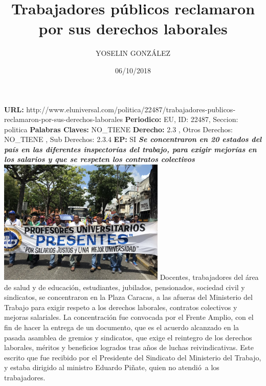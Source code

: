 \documentclass{article}%
\title{\textbf{Trabajadores públicos reclamaron por sus derechos laborales}}%
\author{YOSELIN GONZÁLEZ}%
\date{06/10/2018}%
\begin{document}
%
\normalsize%
\maketitle%
\textbf{URL: }%
http://www.eluniversal.com/politica/22487/trabajadores{-}publicos{-}reclamaron{-}por{-}sus{-}derechos{-}laborales\newline%
%
\textbf{Periodico: }%
EU, %
ID: %
22487, %
Seccion: %
politica\newline%
%
\textbf{Palabras Claves: }%
NO\_TIENE\newline%
%
\textbf{Derecho: }%
2.3%
, Otros Derechos: %
NO\_TIENE%
, Sub Derechos: %
2.3.4%
\newline%
%
\textbf{EP: }%
SI\newline%
\newline%
%
\textbf{\textit{Se concentraron en 20 estados del país en las diferentes inspectorías del trabajo, para exigir mejorías en los salarios y que se respeten los contratos colectivos}}%
\newline%
\newline%
%
\includegraphics[width=300px]{43.jpg}%
\newline%
%
Docentes, trabajadores del área de salud y de educación, estudiantes, jubilados, pensionados, sociedad civil y sindicatos, se concentraron en la Plaza Caracas, a las afueras del Ministerio del Trabajo para exigir respeto a los derechos laborales, contratos colectivos y mejoras salariales.%
\newline%
%
La concentración fue convocada por el Frente Amplio, con el fin de hacer la entrega de un documento, que es el acuerdo alcanzado en la pasada asamblea de gremios y sindicatos, que exige el reintegro de los derechos laborales, méritos y beneficios logrados tras años de luchas reivindicativas.%
\newline%
%
Este escrito que fue recibido por el Presidente del Sindicato del Ministerio del Trabajo, y estaba dirigido al ministro Eduardo Piñate, quien no atendió~a los trabajadores.%
\end{document}
